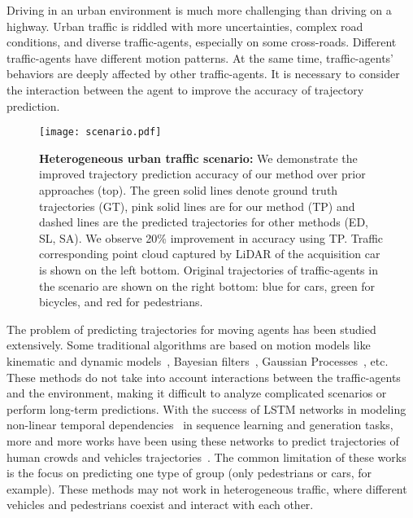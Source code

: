 \documentclass[letterpaper]{article} \usepackage{aaai19}  \usepackage{times}  \usepackage{helvet}  \usepackage{courier}  \usepackage{url}  \usepackage{graphicx}  \usepackage{amsmath}
\begin{document}
Driving in an urban environment is much more challenging than driving on a highway. Urban traffic is riddled with more uncertainties, complex road conditions, and diverse traffic-agents, especially on some cross-roads. Different traffic-agents have different motion patterns. At the same time, traffic-agents’ behaviors are deeply affected by other traffic-agents. It is necessary to consider the interaction between the agent to improve the accuracy of trajectory prediction. 


\begin{figure}
\texttt{[image: scenario.pdf]}
\caption{{\bf Heterogeneous urban traffic scenario:} We demonstrate the improved trajectory prediction accuracy of our method over prior approaches (top). The  green solid lines denote ground truth trajectories (GT), pink solid lines  are for our method (TP) and dashed lines are the predicted trajectories for other methods (ED, SL, SA). We observe 20\% improvement in accuracy using TP. Traffic corresponding point cloud captured by LiDAR of the acquisition car is shown on the left bottom. Original trajectories of traffic-agents in the scenario are shown on the right bottom: blue for cars, green for bicycles, and red for pedestrians.}
\label{fig:traffic_sample}
\vspace{-4ex}
\end{figure}


The problem of predicting trajectories for moving agents has been studied extensively. Some traditional algorithms are based on motion models like kinematic and dynamic models~\cite{toledo2009imm}, Bayesian filters~\cite{kalman1960new}, Gaussian Processes~\cite{rasmussen2006gaussian}, etc. These methods do not take into account interactions between the traffic-agents and the environment, making it difficult to analyze complicated scenarios or perform long-term predictions. With the success of LSTM networks in modeling non-linear temporal dependencies~\cite{ma2017image} in sequence learning and generation tasks, more and more works have been using these networks to predict trajectories of human crowds\cite{alahi2016social} and vehicles trajectories~\cite{lee2017desire}. The common limitation of these works is the focus on predicting one type of group (only pedestrians or cars, for example). These methods may not work in heterogeneous traffic, where different vehicles and pedestrians coexist and interact with each other\cite{DeepTAgent2018}. 
\end{document}
